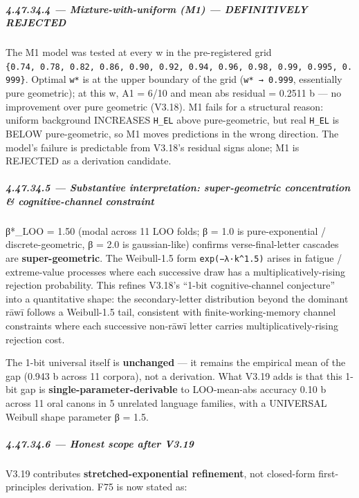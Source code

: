 \documentclass[
]{article}
\begin{document}
\subparagraph{4.47.34.4 --- Mixture-with-uniform (M1) --- DEFINITIVELY
REJECTED}\label{mixture-with-uniform-m1-definitively-rejected}

The M1 model was tested at every w in the pre-registered grid
\texttt{\{0.74,\ 0.78,\ 0.82,\ 0.86,\ 0.90,\ 0.92,\ 0.94,\ 0.96,\ 0.98,\ 0.99,\ 0.995,\ 0.999\}}.
Optimal \texttt{w*} is at the upper boundary of the grid
(\texttt{w*\ →\ 0.999}, essentially pure geometric); at this w, A1 =
6/10 and mean abs residual = 0.2511 b --- no improvement over pure
geometric (V3.18). M1 fails for a structural reason: uniform background
INCREASES \texttt{H\_EL} above pure-geometric, but real \texttt{H\_EL}
is BELOW pure-geometric, so M1 moves predictions in the wrong direction.
The model's failure is predictable from V3.18's residual signs alone; M1
is REJECTED as a derivation candidate.

\subparagraph{4.47.34.5 --- Substantive interpretation: super-geometric
concentration \& cognitive-channel
constraint}\label{substantive-interpretation-super-geometric-concentration-cognitive-channel-constraint}

β*\_LOO = 1.50 (modal across 11 LOO folds; β = 1.0 is pure-exponential /
discrete-geometric, β = 2.0 is gaussian-like) confirms
verse-final-letter cascades are \textbf{super-geometric}. The
Weibull-1.5 form \texttt{exp(−λ·k\^{}1.5)} arises in fatigue /
extreme-value processes where each successive draw has a
multiplicatively-rising rejection probability. This refines V3.18's
``1-bit cognitive-channel conjecture'' into a quantitative shape: the
secondary-letter distribution beyond the dominant rāwī follows a
Weibull-1.5 tail, consistent with finite-working-memory channel
constraints where each successive non-rāwī letter carries
multiplicatively-rising rejection cost.

The 1-bit universal itself is \textbf{unchanged} --- it remains the
empirical mean of the gap (0.943 b across 11 corpora), not a derivation.
What V3.19 adds is that this 1-bit gap is
\textbf{single-parameter-derivable} to LOO-mean-abs accuracy 0.10 b
across 11 oral canons in 5 unrelated language families, with a UNIVERSAL
Weibull shape parameter β = 1.5.

\subparagraph{4.47.34.6 --- Honest scope after
V3.19}\label{honest-scope-after-v3.19}

V3.19 contributes \textbf{stretched-exponential refinement}, not
closed-form first-principles derivation. F75 is now stated as:
\end{document}

